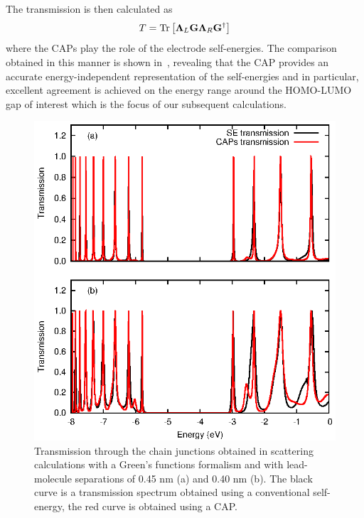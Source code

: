 The transmission is then calculated as
\begin{equation}
  T = \mathop{\mathrm{Tr}}\nolimits \left[ \mathbf{\Lambda}_L \mathbf{G} \mathbf{\Lambda}_R \mathbf{G}^\dagger \right]
  \label{eq:transmfromG}
\end{equation}
where the \acp{CAP} play the role of the electrode self-energies.
The comparison obtained in this manner is shown in~,
revealing that the \ac{CAP} provides an accurate energy-independent
representation of the self-energies and in particular, excellent agreement
is achieved on the energy range around the \ac{HOMO}-\ac{LUMO} gap of
interest which is the focus of our subsequent calculations.

\begin{figure} 
	\begin{center}
		\includegraphics[width=0.9\linewidth]{figures/figure2a_2b}
	\end{center}
	\caption{Transmission through the chain junctions obtained in
	         scattering calculations with a Green's functions formalism
		 and with lead-molecule separations of 0.45 nm (a) and 0.40
		 nm (b). The black curve is a transmission spectrum obtained
		 using a conventional self-energy, the red curve is
		 obtained using a \ac{CAP}.}
	\label{fig:transdat}
\end{figure}

